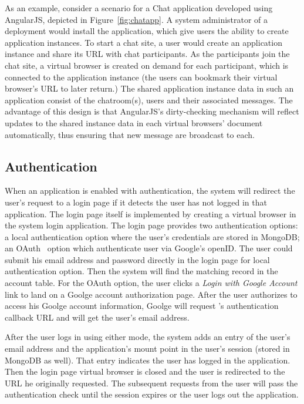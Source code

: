 \chatappfig{}

As an example, consider a scenario for a Chat application developed using AngularJS,
depicted in Figure~\ref{fig:chatapp}.
A system administrator of a \cb deployment would install the application, which give users the
ability to create application instances. To start a chat site, a user would create
an application instance and share its URL with chat participants.  As the participants join
the chat site, a virtual browser is created on demand for each participant, which is connected
to the application instance (the users can bookmark their virtual browser's URL to later return.)
The shared application instance data in such an application
consist of the chatroom(s), users and their associated messages.  The advantage of this design
is that AngularJS's dirty-checking mechanism will reflect updates to the shared instance data
in each virtual browsers' document automatically, thus ensuring that new message are broadcast
to each.

\subsection{Authentication}

When an application is enabled with authentication, the system will redirect
the user's request to a login page if it detects the user has not logged in
that application. The login page itself is implemented by creating a virtual
browser in the system login application. The login page provides two
authentication options: a local authentication option where the user's
credentials are stored in MongoDB; an OAuth~\cite{hardt2012oauth} option which
authenticate user via Google's openID. The user could submit his email address
and password directly in the login page  for local authentication option. Then
the system will find the matching record in the account table.   For the OAuth
option, the user clicks a \emph{Login with Google Account} link  to land on a
Goolge account authorization page. After the user authorizes \cb{} to access
his Goolge account information, Goolge will request \cb{}'s authentication
callback URL and \cb{} will get the user's email address.

After the user logs in using either mode, the system adds an entry of the
user's email address and the application's mount point in the user's session
(stored in MongoDB as well). That entry indicates the user has logged in the
application. Then the login page virtual browser is closed and the user is
redirected to  the URL he originally requested. The subsequent requests from
the user will pass the authentication check until the session expires or the
user logs out the application.


